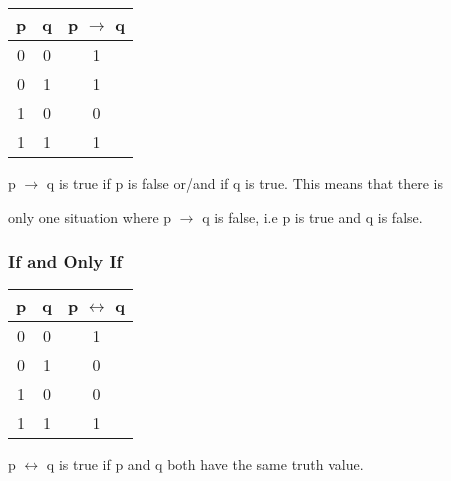 \documentclass{report}
\begin{document}
\begin{center}

  \begin{tabular}{| c | c | c |}

    \hline

    p & q & p $\to$ q \\ \hline

    0 & 0 & 1 \\

    0 & 1 & 1 \\

    1 & 0 & 0 \\

    1 & 1 & 1 \\ \hline

  \end{tabular}

\end{center}



p $\to$ q is true if p is false or/and if q is true. This means that there is

only one situation where p $\to$ q is false, i.e p is true and q is false. 



\subsubsection{If and Only If}



\begin{center}

  \begin{tabular}{| c | c | c |}

    \hline

    p & q & p $\leftrightarrow$ q \\ \hline

    0 & 0 & 1 \\

    0 & 1 & 0 \\

    1 & 0 & 0 \\

    1 & 1 & 1 \\ \hline

  \end{tabular}

\end{center}



p $\leftrightarrow$ q is true if p and q both have the same truth value.
\end{document}
